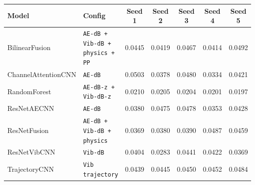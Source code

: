 \begin{tabular}{@{}llccccc@{}}
\toprule
Model & Config & Seed 1 & Seed 2 & Seed 3 & Seed 4 & Seed 5 \\
\midrule
BilinearFusion & \texttt{AE-dB + Vib-dB + physics + PP} & 0.0445 & 0.0419 & 0.0467 & 0.0414 & 0.0492 \\
ChannelAttentionCNN & \texttt{AE-dB} & 0.0503 & 0.0378 & 0.0480 & 0.0334 & 0.0421 \\
RandomForest & \texttt{AE-dB-z + Vib-dB-z} & 0.0210 & 0.0205 & 0.0204 & 0.0201 & 0.0197 \\
ResNetAECNN & \texttt{AE-dB} & 0.0380 & 0.0475 & 0.0478 & 0.0353 & 0.0428 \\
ResNetFusion & \texttt{AE-dB + Vib-dB + physics} & 0.0369 & 0.0380 & 0.0390 & 0.0487 & 0.0459 \\
ResNetVibCNN & \texttt{Vib-dB} & 0.0404 & 0.0283 & 0.0441 & 0.0422 & 0.0369 \\
TrajectoryCNN & \texttt{Vib trajectory} & 0.0439 & 0.0445 & 0.0450 & 0.0452 & 0.0484 \\
\bottomrule
\end{tabular}
